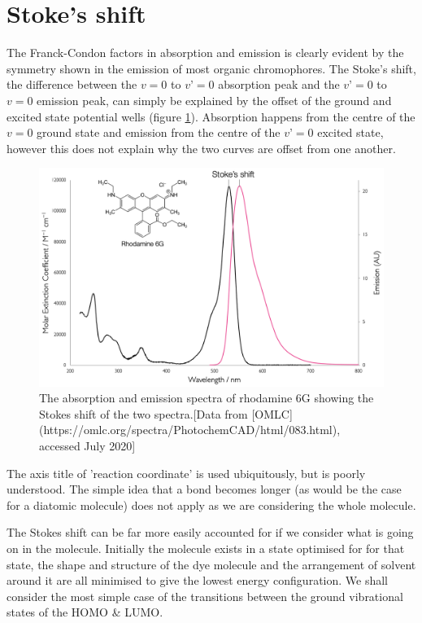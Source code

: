 \documentclass[
]{book}
\begin{document}
\hypertarget{sec:stoke}{%
\section{Stoke's shift}\label{sec:stoke}}

The Franck-Condon factors in absorption and emission is clearly evident by the symmetry shown in the emission of most organic chromophores. The Stoke's shift, the difference between the \(v=0\) to \(v’=0\) absorption peak and the \(v’=0\) to \(v=0\) emission peak, can simply be explained by the offset of the ground and excited state potential wells (figure \ref{fig:stokesspectrum}). Absorption happens from the centre of the \(v=0\) ground state and emission from the centre of the \(v’=0\) excited state, however this does not explain why the two curves are offset from one another.

\begin{figure}

{\centering \includegraphics[width=0.7\linewidth]{images/stokesspectrum} 

}

\caption{The absorption and emission spectra of rhodamine 6G showing the Stokes shift of the two spectra.[Data from [OMLC](https://omlc.org/spectra/PhotochemCAD/html/083.html), accessed July 2020]}\label{fig:stokesspectrum}
\end{figure}

The axis title of 'reaction coordinate' is used ubiquitously, but is poorly understood. The simple idea that a bond becomes longer (as would be the case for a diatomic molecule) does not apply as we are considering the whole molecule.

The Stokes shift can be far more easily accounted for if we consider what is going on in the molecule. Initially the molecule exists in a state optimised for for that state, the shape and structure of the dye molecule and the arrangement of solvent around it are all minimised to give the lowest energy configuration. We shall consider the most simple case of the transitions between the ground vibrational states of the HOMO \& LUMO.
\end{document}
